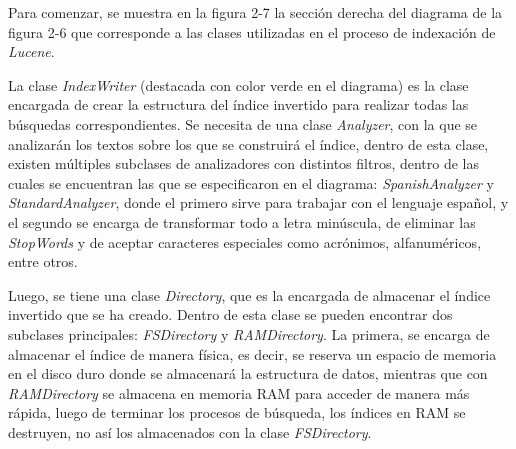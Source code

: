 \documentclass{memoria}
\begin{document}
Para comenzar, se muestra en la figura 2-7 la sección derecha del diagrama de la figura 2-6 que corresponde a las clases utilizadas en el proceso de indexación de \textsl{Lucene}. 

La clase \textsl{IndexWriter} (destacada con color verde en el diagrama) es la clase encargada de crear la estructura del índice invertido para realizar todas las búsquedas correspondientes. Se necesita de una clase \textsl{Analyzer}, con la que se analizarán los textos sobre los que se construirá el índice, dentro de esta clase, existen múltiples subclases de analizadores con distintos filtros, dentro de las cuales se encuentran las que se especificaron en el diagrama: \textsl{SpanishAnalyzer} y \textsl{StandardAnalyzer}, donde el primero sirve para trabajar con el lenguaje español, y el segundo se encarga de transformar todo a letra minúscula, de eliminar las \textsl{StopWords} y de aceptar caracteres especiales como acrónimos, alfanuméricos, entre otros.

Luego, se tiene una clase \textsl{Directory}, que es la encargada de almacenar el índice invertido que se ha creado. Dentro de esta clase se pueden encontrar dos subclases principales: \textsl{FSDirectory} y \textsl{RAMDirectory}. La primera, se encarga de almacenar el índice de manera física, es decir, se reserva un espacio de memoria en el disco duro donde se almacenará la estructura de datos, mientras que con \textsl{RAMDirectory} se almacena en memoria RAM para acceder de manera más rápida, luego de terminar los procesos de búsqueda, los índices en RAM se destruyen, no así los almacenados con la clase \textsl{FSDirectory}. 

\end{document}
